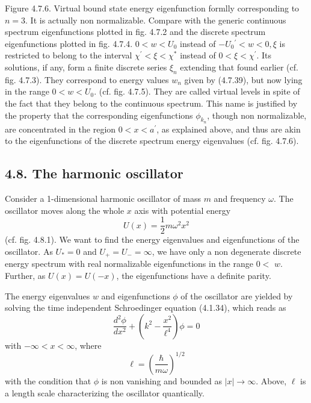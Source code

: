 \documentclass{article}
\begin{document}
Figure 4.7.6. Virtual bound state energy eigenfunction formlly corresponding to $n=3$. It is actually non normalizable. Compare with the generic continuous spectrum eigenfunctions plotted in fig. 4.7.2 and the discrete spectrum eigenfunctions plotted in fig. 4.7.4.
$0<w<U_{0}$ instead of $-U_{0}{ }^{\prime}<w<0, \xi$ is restricted to belong to the interval $\chi^{\prime}<\xi<\chi^{*}$ instead of $0<\xi<\chi^{\prime}$. Its solutions, if any, form a finite discrete series $\xi_{n}$ extending that found earlier (cf. fig. 4.7.3). They correspond to energy values $w_{n}$ given by (4.7.39), but now lying in the range $0<w<U_{0}$. (cf. fig. 4.7.5). They are called virtual levels in spite of the fact that they belong to the continuous spectrum. This name is justified by the property that the corresponding eigenfunctions $\phi_{k_{n}}$, though non normalizable, are concentrated in the region $0<x<a^{\prime}$, as explained above, and thus are akin to the eigenfunctions of the discrete spectrum energy eigenvalues (cf. fig. 4.7.6).

\subsection*{4.8. The harmonic oscillator}

Consider a 1-dimensional harmonic oscillator of mass $m$ and frequency $\omega$. The oscillator moves along the whole $x$ axis with potential energy
$$
\begin{equation*}
U(x)=\frac{1}{2} m \omega^{2} x^{2} \tag{4.8.1}
\end{equation*}
$$
(cf. fig. 4.8.1). We want to find the energy eigenvalues and eigenfunctions of the oscillator. As $U_{*}=0$ and $U_{+}=U_{-}=\infty$, we have only a non degenerate discrete energy spectrum with real normalizable eigenfunctions in the range $0<$ $w$. Further, as $U(x)=U(-x)$, the eigenfunctions have a definite parity.

The energy eigenvalues $w$ and eigenfunctions $\phi$ of the oscillator are yielded by solving the time independent Schroedinger equation (4.1.34), which reads as
$$
\begin{equation*}
\frac{d^{2} \phi}{d x^{2}}+\left(k^{2}-\frac{x^{2}}{\ell^{4}}\right) \phi=0 \tag{4.8.2}
\end{equation*}
$$
with $-\infty<x<\infty$, where
$$
\begin{equation*}
\ell=\left(\frac{\hbar}{m \omega}\right)^{1 / 2} \tag{4.8.3}
\end{equation*}
$$
with the condition that $\phi$ is non vanishing and bounded as $|x| \rightarrow \infty$. Above, $\ell$ is a length scale characterizing the oscillator quantically.
\end{document}
